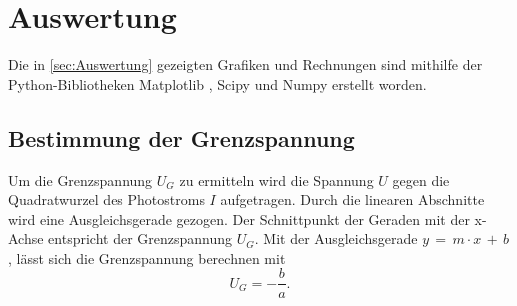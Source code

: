 \section{Auswertung}
\label{sec:Auswertung}

Die in \autoref{sec:Auswertung} gezeigten Grafiken und Rechnungen sind mithilfe der Python-Bibliotheken Matplotlib \cite{matplotlib}, Scipy \cite{scipy} und Numpy \cite{numpy}
erstellt worden.

\subsection{Bestimmung der Grenzspannung}
\label{sec:auswertung_grenzspannung}

Um die Grenzspannung $U_G$ zu ermitteln wird die Spannung $U$ gegen die Quadratwurzel des Photostroms $I$ aufgetragen. 
Durch die linearen Abschnitte wird eine Ausgleichsgerade gezogen.
Der Schnittpunkt der Geraden mit der x-Achse entspricht der Grenzspannung $U_G$.
Mit der Ausgleichsgerade $y \,=\, m \cdot x \,+\, b$, lässt sich die Grenzspannung berechnen mit
\begin{equation}\label{eq:ug}
  U_G = - \frac{b}{a}.
\end{equation}
\\
\\
